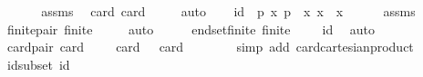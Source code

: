 \begin{isabellebody}
%
\isatagproof
{}\isamarkupfalse%
\ {\isacharminus}{\kern0pt}\ \isanewline
\ \ \isamarkupfalse%
\ assms{\isacharparenleft}{\kern0pt}{}{\isacharparenright}{\kern0pt}\ \isamarkupfalse%
\ card{\isacharunderscore}{\kern0pt}{\isasymK}{\isacharcolon}{\kern0pt}\ {\isachardoublequoteopen}card\ {\isasymK}\ {\isasymge}\ {}{\isachardoublequoteclose}\ \isamarkupfalse%
\ auto\isanewline
\ \ \isamarkupfalse%
\ {\isacharquery}{\kern0pt}id\ {\isacharequal}{\kern0pt}\ {\isachardoublequoteopen}{\isacharbraceleft}{\kern0pt}p{\isachardot}{\kern0pt}\ {\isasymexists}x{\isachardot}{\kern0pt}\ p\ {\isacharequal}{\kern0pt}\ {\isacharparenleft}{\kern0pt}x{\isacharcomma}{\kern0pt}\ x{\isacharparenright}{\kern0pt}\ {\isasymand}\ x\ {\isasymin}\ {\isasymK}{\isacharbraceright}{\kern0pt}{\isachardoublequoteclose}\isanewline
\ \ \isamarkupfalse%
\ assms{\isacharparenleft}{\kern0pt}{}{\isacharparenright}{\kern0pt}\ \isamarkupfalse%
\ finite{\isacharunderscore}{\kern0pt}{\isasymK}{\isacharunderscore}{\kern0pt}pair{\isacharcolon}{\kern0pt}\ {\isachardoublequoteopen}finite\ {\isacharparenleft}{\kern0pt}{\isasymK}\ {\isasymtimes}\ {\isasymK}{\isacharparenright}{\kern0pt}{\isachardoublequoteclose}\ \isamarkupfalse%
\ auto\isanewline
\ \ \isamarkupfalse%
\ \isamarkupfalse%
\ end{\isacharunderscore}{\kern0pt}set{\isacharunderscore}{\kern0pt}finite{\isacharcolon}{\kern0pt}\ {\isachardoublequoteopen}finite\ {\isacharparenleft}{\kern0pt}{\isasymK}\ {\isasymtimes}\ {\isasymK}\ {\isacharminus}{\kern0pt}\ {\isacharquery}{\kern0pt}id{\isacharparenright}{\kern0pt}{\isachardoublequoteclose}\ \isamarkupfalse%
\ auto\isanewline
\isanewline
\ \ \isamarkupfalse%
\ card{\isacharunderscore}{\kern0pt}{\isasymK}{\isacharunderscore}{\kern0pt}pair{\isacharcolon}{\kern0pt}\ {\isachardoublequoteopen}card\ {\isacharparenleft}{\kern0pt}{\isasymK}\ {\isasymtimes}\ {\isasymK}{\isacharparenright}{\kern0pt}\ {\isacharequal}{\kern0pt}\ card\ {\isasymK}\ {\isacharasterisk}{\kern0pt}\ card\ {\isasymK}{\isachardoublequoteclose}\ \isanewline
\ \ \ \ \isamarkupfalse%
\ {\isacharparenleft}{\kern0pt}simp\ add{\isacharcolon}{\kern0pt}\ card{\isacharunderscore}{\kern0pt}cartesian{\isacharunderscore}{\kern0pt}product{\isacharparenright}{\kern0pt}\isanewline
\ \ \isamarkupfalse%
\ id{\isacharunderscore}{\kern0pt}subset{\isacharcolon}{\kern0pt}\ {\isachardoublequoteopen}{\isacharquery}{\kern0pt}id\ {\isasymsubseteq}\ {\isasymK}\ {\isasymtimes}\ {\isasymK}{\isachardoublequoteclose}\ \isamarkupfalse%

\end{isabellebody}
